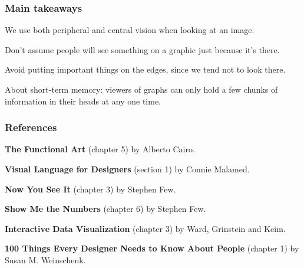 \documentclass[12pt]{beamer}\usepackage[]{graphicx}\usepackage[]{color}
\begin{document}

\begin{frame}
\frametitle{Main takeaways}

\bbi
  \item We use both peripheral and central vision when looking at an image.
  \item Don't assume people will see something on a graphic just because it's
  there.
  \item Avoid putting important things on the edges, since we tend not to
  look there.
  \item About short-term memory: viewers of graphs can only hold a few chunks
  of information in their heads at any one time.
\ei

\end{frame}


\begin{frame}
\frametitle{References}

\bbi
  \item \textbf{The Functional Art} (chapter 5) by Alberto Cairo.
  \item \textbf{Visual Language for Designers} (section 1) by Connie Malamed.
  \item \textbf{Now You See It} (chapter 3) by Stephen Few.
  \item \textbf{Show Me the Numbers} (chapter 6) by Stephen Few.
  \item \textbf{Interactive Data Visualization} (chapter 3) by Ward, Grinstein
  and Keim.
  \item \textbf{100 Things Every Designer Needs to Know About People} 
  (chapter 1) by Susan M. Weinschenk.
\ei

\end{frame}

\end{document}
